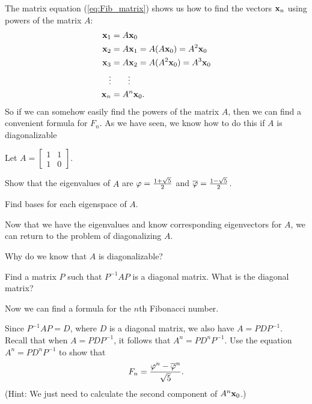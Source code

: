 The matrix equation (\ref{eq:Fib_matrix}) shows us how to find the vectors $\mathbf{x}_n$ using powers of the matrix $A$:
\begin{align*}
\mathbf{x}_1 &= A\mathbf{x}_0 \\
\mathbf{x}_2 &= A\mathbf{x}_1 = A(A\mathbf{x}_0) = A^2\mathbf{x}_0 \\
\mathbf{x}_3 &= A\mathbf{x}_2 = A(A^2\mathbf{x}_0) = A^3\mathbf{x}_0 \\
\ \vdots & \qquad \vdots \\
\mathbf{x}_n &= A^n\mathbf{x}_0.
\end{align*}
So if we can somehow easily find the powers of the matrix $A$, then we can find a convenient formula for $F_n$. As we have seen, we know how to do this if $A$ is diagonalizable


\begin{pactivity} Let $A = \left[ \begin{array}{cc} 1&1 \\ 1&0 \end{array} \right]$. 
\ba
\item Show that the eigenvalues of $A$ are $\varphi = \frac{1 + \sqrt{5}}{2}$ and $\overline{\varphi} = \frac{1 - \sqrt{5}}{2}$.

\item Find bases for each eigenspace of $A$.

\ea

\end{pactivity}

Now that we have the eigenvalues and know corresponding eigenvectors for $A$, we can return  to the problem of diagonalizing $A$. 

\begin{pactivity} \hfill
\ba
\item Why do we know that $A$ is diagonalizable?

\item Find a matrix $P$ such that $P^{-1}AP$ is a diagonal matrix. What is the diagonal matrix?

\ea

\end{pactivity}

Now we can find a formula for the $n$th Fibonacci number.

\begin{pactivity} Since $P^{-1}AP = D$, where $D$ is a diagonal matrix, we also have $A = PDP^{-1}$. Recall that when $A = PDP^{-1}$, it follows that $A^n = PD^nP^{-1}$. Use the equation $A^n = PD^nP^{-1}$ to show that 
\begin{equation} \label{eq:Binet}
F_n = \frac{\varphi^n - \overline{\varphi}^n}{\sqrt{5}}.
\end{equation}
(Hint: We just need to calculate the second component of $A^n \mathbf{x}_0$.)

\end{pactivity}


